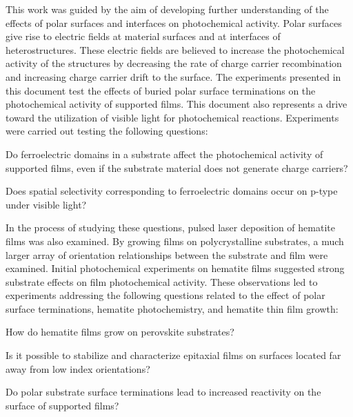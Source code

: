 This work was guided by the aim of developing further understanding of the 
effects of polar surfaces and interfaces on photochemical activity. Polar 
surfaces give rise to electric fields at material surfaces and at interfaces 
of heterostructures. These electric fields are believed to increase the 
photochemical activity of the structures by decreasing the rate of charge 
carrier recombination and increasing charge carrier drift to the surface. 
The experiments presented in this document test the effects of buried polar 
surface terminations on the photochemical activity of supported films. This 
document also represents a drive toward the utilization of visible light 
for photochemical reactions. Experiments were carried out testing the 
following questions:

\begin{items}

	\item Do ferroelectric domains in a substrate affect the photochemical 
	activity of supported films, even if the substrate material does not 
	generate charge carriers?

	\item Does spatial selectivity corresponding to ferroelectric domains 
	occur on p-type  under visible light?

\end{items}

In the process of studying these questions, pulsed laser deposition of 
hematite  films was also examined. By growing films on 
polycrystalline substrates, a much larger array of orientation 
relationships between the substrate and film were examined. Initial 
photochemical experiments on hematite films suggested strong substrate 
effects on film photochemical activity. These observations led to 
experiments addressing the following questions related to the effect of 
polar surface terminations, hematite photochemistry, and hematite thin film 
growth:

\begin{items}

	\item How do hematite films grow on perovskite substrates?

	\item Is it possible to stabilize and characterize epitaxial films on 
	surfaces located far away from low index orientations?
	
	\item Do polar substrate surface terminations lead to increased 
	reactivity 	on the surface of supported films?
	
\end{items}

